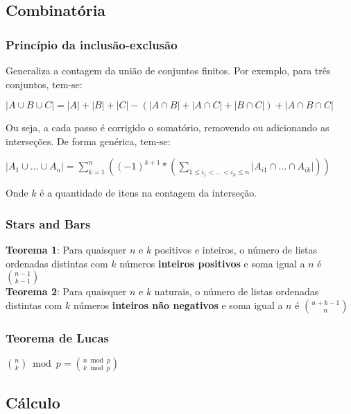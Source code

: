 \subsection{Combinat\'{o}ria}

\subsubsection{Princ\'{i}pio da inclus\~{a}o-exclus\~{a}o}
Generaliza a contagem da uni\~{a}o de conjuntos finitos. Por exemplo, para tr\^{e}s conjuntos, tem-se:

$|A \cup B \cup C| = |A| + |B| + |C| - (|A \cap B| + |A \cap C| + |B \cap C|) + |A \cap B \cap C|$

Ou seja, a cada passo \'{e} corrigido o somat\'{o}rio, removendo ou adicionando as interse\c{c}\~{o}es. De forma gen\'{e}rica, tem-se:

$|A_1 \cup ... \cup A_n| = \sum_{k=1}^{n} ((-1)^{k+1}*(\sum_{1 \leq i_1 < ... < i_k \leq n} |A_{i1} \cap ... \cap A_{ik}|))$

Onde $k$ \'{e} a quantidade de itens na contagem da interse\c{c}\~{a}o.

\divisor

\subsubsection{Stars and Bars}
\textbf{Teorema 1}: Para quaisquer $n$ e $k$ positivos e inteiros, o n\'{u}mero de listas ordenadas distintas com $k$ n\'{u}meros \textbf{inteiros positivos} e soma igual a $n$ \'{e} ${n-1 \choose k-1}$ \\

\textbf{Teorema 2}: Para quaisquer $n$ e $k$ naturais, o n\'{u}mero de listas ordenadas distintas com $k$ n\'{u}meros \textbf{inteiros n\~{a}o negativos} e soma igual a $n$ \'{e} ${n+k-1 \choose n}$

\divisor

\subsubsection{Teorema de Lucas}

${n \choose k} \bmod{p} = {n \bmod{p} \choose k \bmod{p}}$



\subsection{Cálculo}

